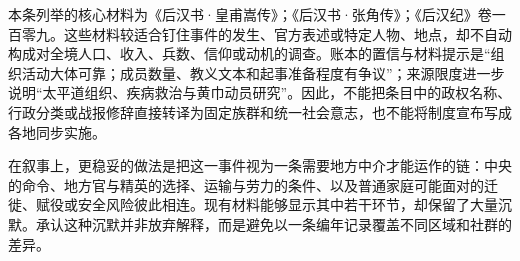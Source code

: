 本条列举的核心材料为《后汉书·皇甫嵩传》；《后汉书·张角传》；《后汉纪》卷一百零九。这些材料较适合钉住事件的发生、官方表述或特定人物、地点，却不自动构成对全境人口、收入、兵数、信仰或动机的调查。账本的置信与材料提示是“组织活动大体可靠；成员数量、教义文本和起事准备程度有争议”；来源限度进一步说明“太平道组织、疾病救治与黄巾动员研究”。因此，不能把条目中的政权名称、行政分类或战报修辞直接转译为固定族群和统一社会意志，也不能将制度宣布写成各地同步实施。

在叙事上，更稳妥的做法是把这一事件视为一条需要地方中介才能运作的链：中央的命令、地方官与精英的选择、运输与劳力的条件、以及普通家庭可能面对的迁徙、赋役或安全风险彼此相连。现有材料能够显示其中若干环节，却保留了大量沉默。承认这种沉默并非放弃解释，而是避免以一条编年记录覆盖不同区域和社群的差异。
